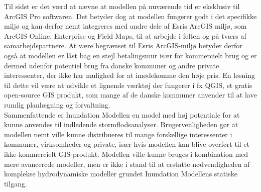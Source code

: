 Til sidst er det værd at nævne at modellen på nuværende tid er eksklusiv til ArcGIS Pro softwaren. Det betyder dog at modellen fungerer godt i det specifikke miljø og kan derfor nemt integreres med andre dele af Esris ArcGIS miljø, som ArcGIS Online, Enterprise og Field Maps, til at arbejde i felten og på tværs af samarbejdspartnere. At være begrænset til Esris ArcGIS-miljø betyder derfor også at modellen er låst bag en stejl betalingsmur især for kommercielt brug og er dermed udenfor potentiel brug fra danske kommuner og andre private interessenter, der ikke har mulighed for at imødekomme den høje pris. En løsning til dette vil være at udvikle et lignende værktøj der fungerer i fx QGIS, et gratis open-source GIS produkt, som mange af de danske kommuner anvender til at lave rumlig planlægning og forvaltning.\\

Sammenfattende er Inundation Modellen en model med høj potentiale for at kunne anvendes til indledende stormflodsanalyser. Brugervenligheden gør at modellen nemt ville kunne distribueres til mange forskellige interessenter i kommuner, virksomheder og private, især hvis modellen kan blive overført til et ikke-kommercielt GIS-produkt. Modellen ville kunne bruges i kombination med mere avancerede modeller, men er ikke i stand til at erstatte nødvendigheden af komplekse hydrodynamiske modeller grundet Inundation Modellens statiske tilgang.





  





